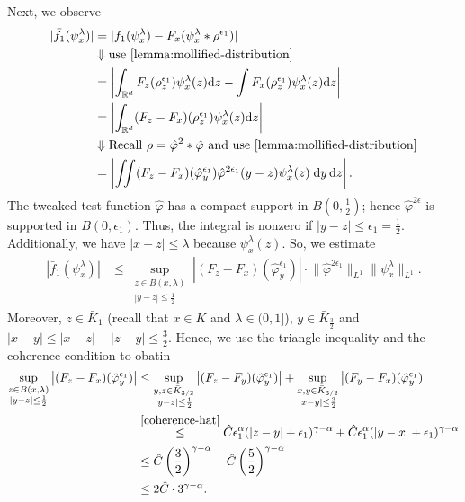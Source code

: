 Next, we observe
\begin{align*}
    |\bar f_1(\psi_x^\lambda)| &= |f_1(\psi_x^\lambda) - F_x(\psi_x^\lambda* \rho^{\epsilon_1})| \\
    &\Downarrow \text{use \eqref{lemma:mollified-distribution}} \\
    &= \left | \int_{\mathbb{R}^d} F_z(\rho_z^{\epsilon_1}) \psi^\lambda_x(z)  \mathrm{d}z -  \int F_x(\rho_z^{\epsilon_1}) \psi^\lambda_x(z) \mathrm{d} z \right| \\
    &= \left | \int_{\mathbb{R}^d} (F_z - F_x)(\rho_z^{\epsilon_1}) \psi^\lambda_x(z)  \mathrm{d}z\right| \\
    &\Downarrow  \text{Recall $\rho = \hat \varphi^2 * \hat \varphi$ and use \eqref{lemma:mollified-distribution}} \\
    &= \left| \iint (F_z - F_x)(\hat \varphi^{\epsilon_1}_y) \hat \varphi^{2\epsilon_1}(y-z)\psi^\lambda_x(z) \; \mathrm{d}y \, \mathrm{d}z \right|.
\end{align*}
The tweaked test function $\hat \varphi$ has a compact support in $B(0, \frac{1}{2})$; hence $\hat \varphi^{2\epsilon}$ is supported in $B(0, \epsilon_1)$. Thus, the integral is nonzero if $|y-z| \leq \epsilon_1 = \frac{1}{2}$. Additionally, we have $|x-z|\leq \lambda$ because $\psi^\lambda_x(z)$. So, we estimate
\begin{align*}
    |\bar f_1(\psi_x^\lambda)| &\leq  \sup_{\substack{z \in B(x, \lambda) \\ |y-z| \leq \frac{1}{2}}} \left| (F_z - F_x)(\hat \varphi^{\epsilon_1}_y) \right|  \cdot \lVert \hat \varphi^{2\epsilon_1} \rVert_{L^1} \lVert  \psi^{\lambda}_x \rVert_{L^1}.
\end{align*}
Moreover, $z \in \bar K_1$ (recall that $x \in K$ and $\lambda \in (0,1]$), $y \in \bar K_{\frac{3}{2}}$ and $|x-y| \leq |x-z| + |z-y| \leq \frac{3}{2}$. Hence, we use the triangle inequality and the coherence condition to obatin 
\begin{align*}
    \sup_{\substack{z \in B(x, \lambda) \\ |y-z| \leq
     \frac{1}{2}}} \left| (F_z - F_x)(\hat \varphi^{\epsilon_1}_y) \right| 
     &\leq \sup_{\substack{y, z \in \bar K_{3/2} \\ |y-z| \leq \frac{1}{2}}} \left| (F_z - F_y)(\hat \varphi^{\epsilon_1}_y) \right| + \sup_{\substack{x,y \in \bar K_{3/2} \\ |x-y| \leq \frac{3}{2}}} \left| (F_y - F_x)(\hat \varphi^{\epsilon_1}_y) \right| \\
     &\overset{\eqref{coherence-hat}}{\leq} \hat C \epsilon_1^\alpha(|z-y| + \epsilon_1)^{\gamma - \alpha} + \hat C \epsilon_1^\alpha(|y-x| + \epsilon_1)^{\gamma - \alpha}\\
     &\leq \hat C \left(\frac{3}{2}\right)^{\gamma - \alpha } + \hat C \left(\frac{5}{2}\right)^{\gamma - \alpha } \\
     &\leq 2\hat C \cdot  3^{\gamma - \alpha}.
\end{align*}
